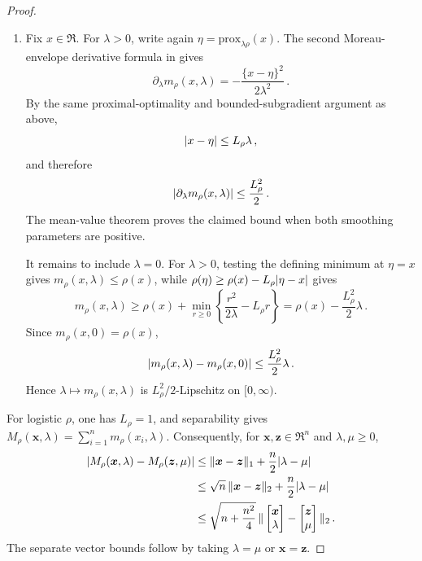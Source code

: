 \documentclass{article}
\makeatletter
\theoremstyle{definition}
\newcommand{\vnorm}[1]{%
	\ensuremath{%
		\if@display
		\left\| #1 \right\|
		\else
		\| #1 \|
		\fi
	}%
}
\newcommand{\abs}[1]{%
	\ensuremath{%
		\if@display
		\left| #1 \right|
		\else
		\lvert #1 \rvert
		\fi
	}%
}
\newcommand*{\bb}{\boldsymbol}
\newcommand{\prox}[2]{\ensuremath{\textrm{prox}_{#1}\left(#2\right)}}
\def\bx{\bb{x}}
\def\bz{\bb{z}}
\makeatother
\begin{document}
\begin{bibunit}
\begin{proof}
\begin{enumerate}[label=(\roman{*})]
    \item
    Fix $x\in\Re$. For $\lambda>0$, write again
    $\eta=\prox{\lambda\rho}{x}$. The second
    Moreau-envelope derivative formula in
    \citet[Lemma~2, equation~(29)]{salehi+et+al:2019} gives
    $$
        \partial_\lambda m_\rho(x,\lambda)
        =
        -
        \frac{
            \{x-\eta\}^2
        }{
            2\lambda^2
        }\,.
    $$
    By the same proximal-optimality and bounded-subgradient argument as
    above,
    $$
        \abs{x-\eta}
        \leq
        L_\rho\lambda\,,
    $$
    and therefore
    $$
        \abs{\partial_\lambda m_\rho(x,\lambda)}
        \leq
        \frac{L_\rho^2}{2}\,.
    $$
    The mean-value theorem proves the claimed bound when both smoothing
    parameters are positive.

    It remains to include $\lambda=0$. For $\lambda>0$, testing the
    defining minimum at $\eta=x$ gives
    $m_\rho(x,\lambda)\leq\rho(x)$, while
    $\rho(\eta)\geq\rho(x)-L_\rho\abs{\eta-x}$ gives
    $$
        m_\rho(x,\lambda)
        \geq
        \rho(x)
        +
        \underset{r\geq0}{\min}
        \left\{
            \frac{r^2}{2\lambda}
            -
            L_\rho r
        \right\}
        =
        \rho(x)
        -
        \frac{L_\rho^2}{2}\lambda\,.
    $$
    Since $m_\rho(x,0)=\rho(x)$,
    $$
        \abs{
            m_\rho(x,\lambda)-m_\rho(x,0)
        }
        \leq
        \frac{L_\rho^2}{2}\lambda\,.
    $$
    Hence $\lambda\mapsto m_\rho(x,\lambda)$ is
    $L_\rho^2/2$-Lipschitz on $[0,\infty)$.
\end{enumerate}

For logistic $\rho$, one has $L_\rho=1$, and separability
\citep[Lemma~6, equation~(35)]{salehi+et+al:2019} gives
$M_\rho(\bx,\lambda)=\sum_{i=1}^nm_\rho(x_i,\lambda)$. Consequently,
for $\bx,\bz\in\Re^n$ and $\lambda,\mu\geq0$,
$$
\begin{aligned}
    \abs{
        M_\rho(\bx,\lambda)
        -
        M_\rho(\bz,\mu)
    }
    &\leq
    \vnorm{\bx-\bz}_1
    +
    \frac n2\abs{\lambda-\mu}
    \\
    &\leq
    \sqrt n\,\vnorm{\bx-\bz}_2
    +
    \frac n2\abs{\lambda-\mu}
    \\
    &\leq
    \sqrt{
        n+\frac{n^2}{4}
    }\,
    \vnorm{
        \begin{bmatrix}
            \bx\\
            \lambda
        \end{bmatrix}
        -
        \begin{bmatrix}
            \bz\\
            \mu
        \end{bmatrix}
    }_2\,.
\end{aligned}
$$
The separate vector bounds follow by taking $\lambda=\mu$ or $\bx=\bz$.
\end{proof}

\clearpage
\putbib
\end{bibunit}
\end{document}
